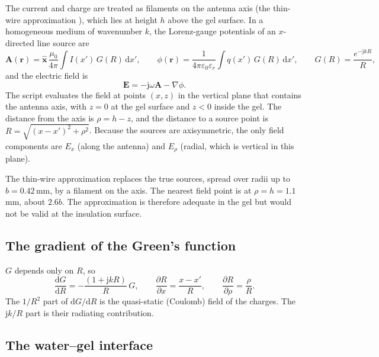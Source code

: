 \documentclass[11pt,a4paper]{article}
\newcommand{\eps}{\varepsilon}
\newcommand{\dd}{\mathrm{d}}
\newcommand{\jj}{\mathrm{j}}
\begin{document}
The current and charge are treated as filaments on the antenna axis (the thin-wire approximation
\cite{Balanis2016}), which lies at height $h$ above the gel surface. In a homogeneous medium of wavenumber
$k$, the Lorenz-gauge potentials of an $x$-directed line source are \cite{Jackson1999,Balanis2016}
\begin{equation}
  \mathbf{A}(\mathbf r) = \hat{\mathbf x}\,\frac{\mu_0}{4\pi}\int I(x')\,G(R)\,\dd x', \qquad
  \phi(\mathbf r) = \frac{1}{4\pi\eps_0\eps_r}\int q(x')\,G(R)\,\dd x', \qquad
  G(R) = \frac{e^{-\jj kR}}{R},
  \label{eq:potentials}
\end{equation}
and the electric field is
\begin{equation}
  \mathbf E = -\jj\omega\mathbf A - \nabla\phi .
  \label{eq:EAphi}
\end{equation}
The script evaluates the field at points $(x,z)$ in the vertical plane that contains the antenna axis, with
$z=0$ at the gel surface and $z<0$ inside the gel. The distance from the axis is $\rho = h - z$, and the
distance to a source point is $R=\sqrt{(x-x')^2+\rho^2}$. Because the sources are axisymmetric, the only
field components are $E_x$ (along the antenna) and $E_\rho$ (radial, which is vertical in this plane).

The thin-wire approximation replaces the true sources, spread over radii up to $b=0.42$\,mm, by a filament
on the axis. The nearest field point is at $\rho=h=1.1$\,mm, about $2.6b$. The approximation is therefore
adequate in the gel but would not be valid at the insulation surface.

\subsection{The gradient of the Green's function}

$G$ depends only on $R$, so
\begin{equation}
  \frac{\dd G}{\dd R} = -\frac{(1+\jj kR)}{R}\,G, \qquad
  \frac{\partial R}{\partial x} = \frac{x-x'}{R}, \qquad
  \frac{\partial R}{\partial \rho} = \frac{\rho}{R}.
\end{equation}
The $1/R^2$ part of $\dd G/\dd R$ is the quasi-static (Coulomb) field of the charges. The $\jj k/R$ part is
their radiating contribution.

\subsection{The water--gel interface}
\end{document}
